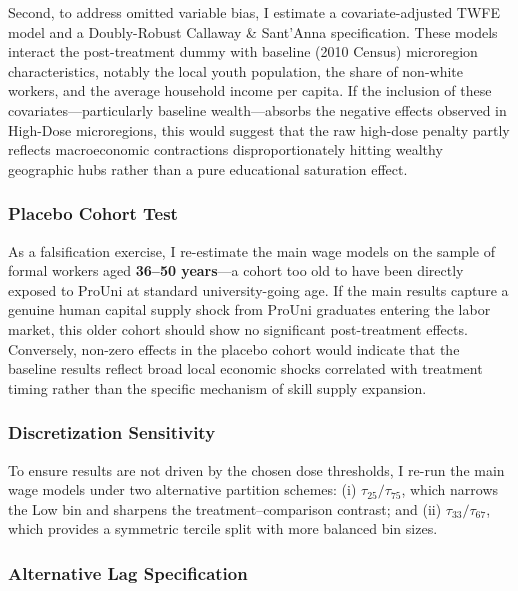 Second, to address omitted variable bias, I estimate a covariate-adjusted TWFE model and a Doubly-Robust Callaway \& Sant'Anna specification. These models interact the post-treatment dummy with baseline (2010 Census) microregion characteristics, notably the local youth population, the share of non-white workers, and the average household income per capita. If the inclusion of these covariates---particularly baseline wealth---absorbs the negative effects observed in High-Dose microregions, this would suggest that the raw high-dose penalty partly reflects macroeconomic contractions disproportionately hitting wealthy geographic hubs rather than a pure educational saturation effect.


\subsubsection{Placebo Cohort Test}
\label{sec:robustness_placebo}

As a falsification exercise, I re-estimate the main wage models on the sample of formal workers aged \textbf{36--50 years}---a cohort too old to have been directly exposed to ProUni at standard university-going age. If the main results capture a genuine human capital supply shock from ProUni graduates entering the labor market, this older cohort should show no significant post-treatment effects. Conversely, non-zero effects in the placebo cohort would indicate that the baseline results reflect broad local economic shocks correlated with treatment timing rather than the specific mechanism of skill supply expansion.


\subsubsection{Discretization Sensitivity}
\label{sec:robustness_discretization}

To ensure results are not driven by the chosen dose thresholds, I re-run the main wage models under two alternative partition schemes: (i) $\tau_{25}/\tau_{75}$, which narrows the Low bin and sharpens the treatment--comparison contrast; and (ii) $\tau_{33}/\tau_{67}$, which provides a symmetric tercile split with more balanced bin sizes.


\subsubsection{Alternative Lag Specification}
\label{sec:robustness_lag}

